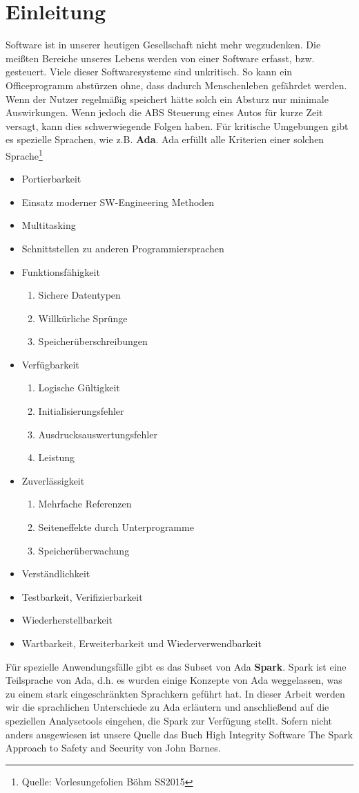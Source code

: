 \section{Einleitung}
Software ist in unserer heutigen Gesellschaft nicht mehr wegzudenken. Die meißten Bereiche unseres Lebens werden von einer Software erfasst, bzw. gesteuert. Viele dieser Softwaresysteme sind unkritisch. So kann ein Officeprogramm abstürzen ohne, dass dadurch Menschenleben gefährdet werden. Wenn der Nutzer regelmäßig speichert hätte solch ein Absturz nur minimale Auswirkungen. Wenn jedoch die ABS Steuerung eines Autos für kurze Zeit versagt, kann dies schwerwiegende Folgen haben.
Für kritische Umgebungen gibt es spezielle Sprachen, wie z.B. \textbf{Ada}.
Ada erfüllt alle Kriterien einer solchen Sprache\footnote{Quelle: Vorlesungefolien Böhm SS2015}
\begin{itemize}
\setlength\itemsep{0.5em}
\item Portierbarkeit
\item Einsatz moderner SW-Engineering Methoden
\item Multitasking
\item Schnittstellen zu anderen Programmiersprachen
\item Funktionsfähigkeit \begin{enumerate}
\item Sichere Datentypen
\item Willkürliche Sprünge
\item Speicherüberschreibungen
\end{enumerate}
\item Verfügbarkeit
\begin{enumerate}
\item Logische Gültigkeit
\item Initialisierungsfehler
\item Ausdrucksauswertungsfehler
\item Leistung
\end{enumerate}
\item Zuverlässigkeit
\begin{enumerate}
\item Mehrfache Referenzen
\item Seiteneffekte durch Unterprogramme
\item Speicherüberwachung
\end{enumerate}
\item Verständlichkeit
\item Testbarkeit, Verifizierbarkeit
\item Wiederherstellbarkeit
\item Wartbarkeit, Erweiterbarkeit und Wiederverwendbarkeit
\end{itemize}

Für spezielle Anwendungsfälle gibt es das Subset von Ada \textbf{Spark}. Spark ist eine Teilsprache von Ada, d.h. es wurden einige Konzepte von Ada weggelassen, was zu einem stark eingeschränkten Sprachkern geführt hat.
In dieser Arbeit werden wir die sprachlichen Unterschiede zu Ada erläutern und anschließend auf die speziellen Analysetools eingehen, die Spark zur Verfügung stellt. Sofern nicht anders ausgewiesen ist unsere Quelle das Buch High Integrity Software The Spark Approach to Safety and Security von John Barnes.